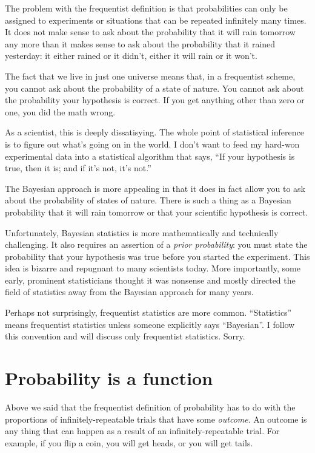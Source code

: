 The problem with the frequentist definition is that probabilities can only
be assigned to experiments or situations that can be repeated infinitely many
times. It does not make sense to ask about the probability that it will rain
tomorrow any more than it makes sense to ask about the probability that it
rained yesterday: it either rained or it didn't, either it will rain or it
won't.

The fact that we live in just one universe means that, in a frequentist scheme,
you cannot ask about the probability of a state of nature. You cannot ask about
the probability your hypothesis is correct. If you get anything other than zero
or one, you did the math wrong.

As a scientist, this is deeply dissatisying.  The whole point of statistical
inference is to figure out what's going on in the world. I don't want to feed
my hard-won experimental data into a statistical algorithm that says, ``If your
hypothesis is true, then it is; and if it's not, it's not.''

The Bayesian approach is more appealing in that it does in fact allow you to
ask about the probability of states of nature. There is such a thing as a
Bayesian probability that it will rain tomorrow or that your scientific
hypothesis is correct.

Unfortunately, Bayesian statistics is more mathematically and technically
challenging. It also requires an assertion of a \emph{prior probability}: you
must state the probability that your hypothesis was true before you started the
experiment. This idea is bizarre and repugnant to many scientists today. More
importantly, some early, prominent statisticians thought it was nonsense and
mostly directed the field of statistics away from the Bayesian approach for
many years.

Perhaps not surprisingly, frequentist statistics are more common.
``Statistics'' means frequentist statistics unless someone explicitly says
``Bayesian''. I follow this convention and will discuss only frequentist
statistics. Sorry.


\section{Probability is a function}

Above we said that the frequentist definition of probability has to do with the
proportions of infinitely-repeatable trials that have some \emph{outcome}. An
outcome is any thing that can happen as a result of an infinitely-repeatable
trial. For example, if you flip a coin, you will get heads, or you will get
tails.

